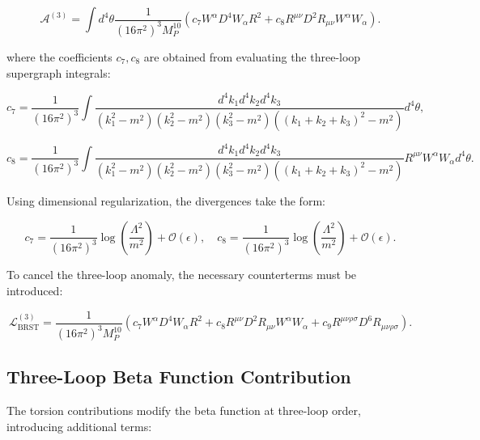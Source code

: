 \documentclass[12pt, onecolumn]{article}
\theoremstyle{definition}
\numberwithin{equation}{section}
\begin{document}
\begin{equation}
    \mathcal{A}^{(3)} = \int d^4\theta \frac{1}{(16\pi^2)^3 M_P^{10}} \left( c_7 W^{\alpha} D^4 W_{\alpha} R^2 + c_8 R^{\mu\nu} D^2 R_{\mu\nu} W^{\alpha} W_{\alpha} \right).
    \label{eq:three-loop-anomaly-supergraph}
\end{equation}

where the coefficients \( c_7, c_8 \) are obtained from evaluating the three-loop supergraph integrals:

\begin{equation}
    c_7 = \frac{1}{(16\pi^2)^3} \int \frac{d^4k_1 d^4k_2 d^4k_3}{(k_1^2 - m^2)(k_2^2 - m^2)(k_3^2 - m^2)((k_1 + k_2 + k_3)^2 - m^2)} d^4\theta,
    \label{eq:c7-integral}
\end{equation}

\begin{equation}
    c_8 = \frac{1}{(16\pi^2)^3} \int \frac{d^4k_1 d^4k_2 d^4k_3}{(k_1^2 - m^2)(k_2^2 - m^2)(k_3^2 - m^2)((k_1 + k_2 + k_3)^2 - m^2)} R^{\mu\nu} W^{\alpha} W_{\alpha} d^4\theta.
    \label{eq:c8-integral}
\end{equation}

Using dimensional regularization, the divergences take the form:

\begin{equation}
    c_7 = \frac{1}{(16\pi^2)^3} \log \left( \frac{\Lambda^2}{m^2} \right) + \mathcal{O}(\epsilon), \quad c_8 = \frac{1}{(16\pi^2)^3} \log \left( \frac{\Lambda^2}{m^2} \right) + \mathcal{O}(\epsilon).
    \label{eq:c7-c8-results}
\end{equation}

To cancel the three-loop anomaly, the necessary counterterms must be introduced:

\begin{equation}
    \mathcal{L}_{\text{BRST}}^{(3)} = \frac{1}{(16\pi^2)^3 M_P^{10}} \left( c_7 W^{\alpha} D^4 W_{\alpha} R^2 + c_8 R^{\mu\nu} D^2 R_{\mu\nu} W^{\alpha} W_{\alpha} + c_9 R^{\mu\nu\rho\sigma} D^6 R_{\mu\nu\rho\sigma} \right).
    \label{eq:three-loop-counterterm}
\end{equation}

\subsection{Three-Loop Beta Function Contribution}
\label{subsec:three-loop-beta}

The torsion contributions modify the beta function at three-loop order, introducing additional terms:
\end{document}
